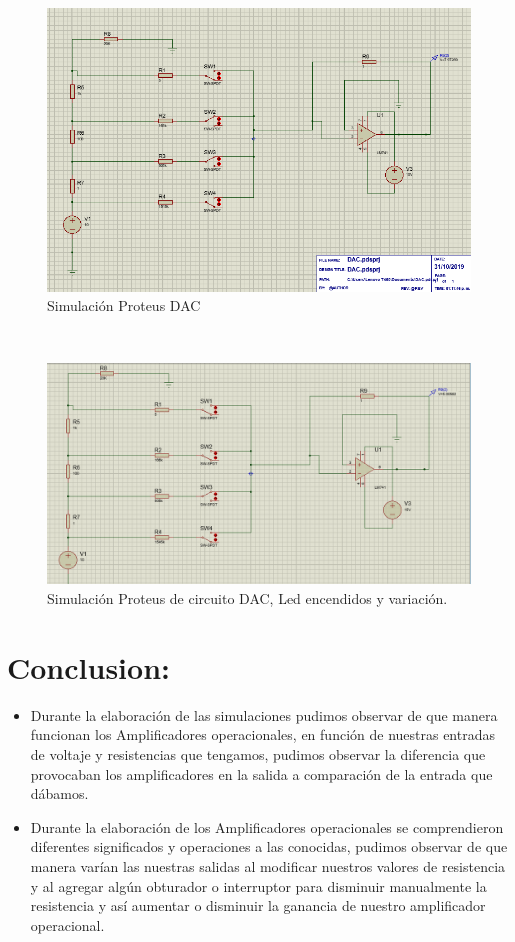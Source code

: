 \documentclass[14pt,letterpaper]{article}
\begin{document}
\
\begin{figure}[h!]
\begin{center}
\includegraphics[scale=0.5]{Simulacion-PCB/dac.png}
\caption{Simulación Proteus DAC} 
\end{center}
\end{figure}

\
\begin{figure}[h!]
\begin{center}
\includegraphics[scale=0.5]{Simulacion-PCB/simdac.png} 
\caption{Simulación Proteus de circuito DAC, Led encendidos y variación.}
\end{center}
\end{figure}

\section{Conclusion:}
\begin{itemize}
\item Durante la elaboración de las simulaciones pudimos observar de que manera funcionan los Amplificadores operacionales, en función de nuestras entradas de voltaje y resistencias que tengamos, pudimos observar la diferencia que provocaban los amplificadores en la salida a comparación de la entrada que dábamos.
\item Durante la elaboración de los Amplificadores operacionales se comprendieron diferentes significados y operaciones a las conocidas, pudimos observar de que manera varían las nuestras salidas al modificar nuestros valores de resistencia y al agregar algún obturador o interruptor para disminuir manualmente la resistencia y así aumentar o disminuir la ganancia de nuestro amplificador operacional.

\end{itemize}
\end{document}
